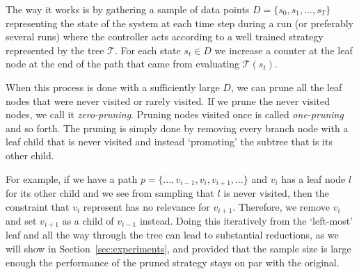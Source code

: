 The way it works is by gathering a sample of data points $D = \{ s_0, s_1,
\ldots, s_T\}$ representing the state of the system at each time step during a
run (or preferably several runs) where the controller acts according to a well
trained strategy represented by the tree $\mathcal{T}$. For each state $s_t \in
D$ we increase a counter at the leaf node at the end of the path that came from
evaluating $\mathcal{T}(s_t)$.

When this process is done with a sufficiently large $D$, we can prune all the
leaf nodes that were never visited or rarely visited. If we prune the never
visited nodes, we call it \textit{zero-pruning}. Pruning nodes visited once is
called \textit{one-pruning} and so forth. The pruning is simply done by removing
every branch node with a leaf child that is never visited and instead
`promoting' the subtree that is its other child.

For example, if we have a path $p = \{ \ldots, v_{i-1}, v_i, v_{i+1}, \ldots \}$
and $v_i$ has a leaf node $l$ for its other child and we see from sampling that
$l$ is never visited, then the constraint that $v_i$ represent has no relevance
for $v_{i+1}$. Therefore, we remove $v_i$ and set $v_{i+1}$ as a child of
$v_{i-1}$ instead. Doing this iteratively from the `left-most' leaf and all the
way through the tree can lead to substantial reductions, as we will show in
Section~\ref{sec:experiments}, and provided that the sample size is large enough
the performance of the pruned strategy stays on par with the original.

